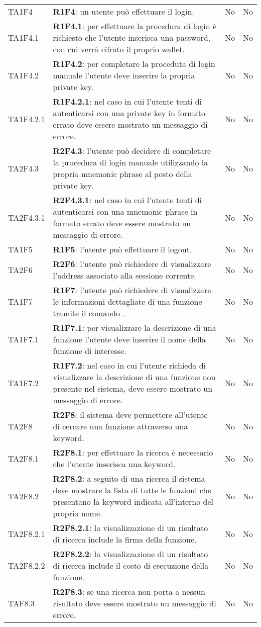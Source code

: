 \begin{longtable}{
		>{\centering}p{} 
		>{}p{}
		>{\centering}p{}
		>{\centering}p{} }
	TA1F4 		& \textbf{R1F4}: un utente può effettuare il login. 									& No & No \tabularnewline
	TA1F4.1 		& \textbf{R1F4.1}: per effettuare la procedura di login è richiesto che l'utente inserisca una password, con cui verrà cifrato il proprio wallet\ped{\textit{G}}. 						& No & No \tabularnewline
	TA1F4.2 		& \textbf{R1F4.2}: per completare la proceduta di login manuale l'utente deve inserire la propria private key\ped{\textit{G}}. 															& No & No \tabularnewline
	TA1F4.2.1 	& \textbf{R1F4.2.1}: nel caso in cui l'utente tenti di autenticarsi con una private key\ped{\textit{G}} in formato errato deve essere mostrato un messaggio di errore. 										& No & No \tabularnewline
	TA2F4.3 		& \textbf{R2F4.3}: l'utente può decidere di completare la procedura di login manuale utilizzando la propria mnemonic phrase\ped{\textit{G}} al posto della private key\ped{\textit{G}}.					& No & No \tabularnewline
	TA2F4.3.1 	& \textbf{R2F4.3.1}: nel caso in cui l'utente tenti di autenticarsi con una mnemonic phrase\ped{\textit{G}} in formato errato deve essere mostrato un messaggio di errore. 									& No & No \tabularnewline

	TA1F5 		& \textbf{R1F5}: l'utente può effettuare il logout. 																																	& No & No \tabularnewline

	TA2F6 		& \textbf{R2F6}: l'utente può richiedere di visualizzare l'address associato alla sessione corrente. 																					& No & No \tabularnewline

	TA1F7 		& \textbf{R1F7}: l'utente può richiedere di visualizzare le informazioni dettagliate di una funzione tramite il comando \info{}.		& No & No \tabularnewline
	TA1F7.1 		& \textbf{R1F7.1}: per visualizzare la descrizione di una funzione l'utente deve inserire il nome della funzione di interesse.															& No & No \tabularnewline
	TA1F7.2 		& \textbf{R1F7.2}: nel caso in cui l'utente richieda di visualizzare la descrizione di una funzione non presente nel sistema, deve essere mostrato un messaggio di	errore.			 			& No & No \tabularnewline

	TA2F8 		& \textbf{R2F8}: il sistema deve permettere all'utente di cercare una funzione attraverso una keyword. 																					& No & No \tabularnewline
	TA2F8.1 		& \textbf{R2F8.1}: per effettuare la ricerca è necessario che l'utente inserisca una keyword. 																							& No & No \tabularnewline
	TA2F8.2 		& \textbf{R2F8.2}: a seguito di una ricerca il sistema deve mostrare la lista di	tutte le funzioni che presentano la keyword indicata all'interno del proprio nome.						& No & No \tabularnewline
	TA2F8.2.1 	& \textbf{R2F8.2.1}: la visualizzazione di un risultato di ricerca include	la firma della funzione.																						& No & No \tabularnewline
	TA2F8.2.2 	& \textbf{R2F8.2.2}: la visualizzazione di un risultato di ricerca include	il costo di esecuzione della funzione.																			& No & No \tabularnewline
	TAF8.3 		& \textbf{R2F8.3}: se una ricerca non porta a nessun risultato deve essere mostrato un messaggio di errore. 																				& No & No \tabularnewline


\end{longtable}
